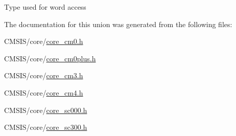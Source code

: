 Type used for word access 

The documentation for this union was generated from the following files\+:\begin{DoxyCompactItemize}
\item 
C\+M\+S\+I\+S/core/\mbox{\hyperlink{core__cm0_8h}{core\+\_\+cm0.\+h}}\item 
C\+M\+S\+I\+S/core/\mbox{\hyperlink{core__cm0plus_8h}{core\+\_\+cm0plus.\+h}}\item 
C\+M\+S\+I\+S/core/\mbox{\hyperlink{core__cm3_8h}{core\+\_\+cm3.\+h}}\item 
C\+M\+S\+I\+S/core/\mbox{\hyperlink{core__cm4_8h}{core\+\_\+cm4.\+h}}\item 
C\+M\+S\+I\+S/core/\mbox{\hyperlink{core__sc000_8h}{core\+\_\+sc000.\+h}}\item 
C\+M\+S\+I\+S/core/\mbox{\hyperlink{core__sc300_8h}{core\+\_\+sc300.\+h}}\end{DoxyCompactItemize}
